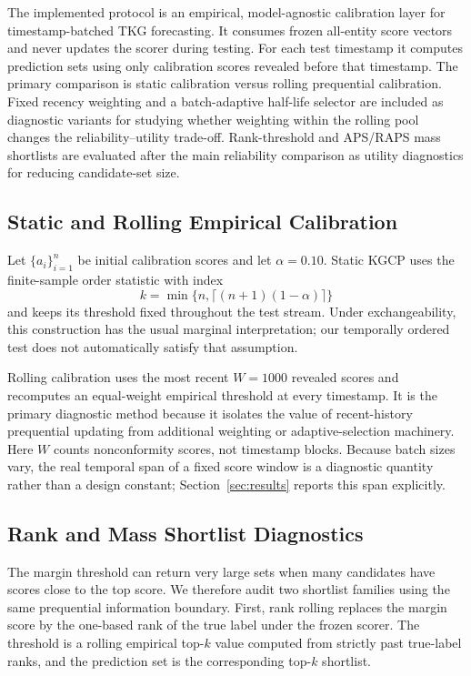 \documentclass[10pt,twocolumn]{article}
\begin{document}
The implemented protocol is an empirical, model-agnostic calibration layer for
timestamp-batched TKG forecasting. It consumes frozen all-entity score vectors
and never updates the scorer during testing. For each test timestamp it computes
prediction sets using only calibration scores revealed before that timestamp.
The primary comparison is static calibration versus rolling prequential
calibration. Fixed recency weighting and a batch-adaptive half-life selector are
included as diagnostic variants for studying whether weighting within the
rolling pool changes the reliability--utility trade-off. Rank-threshold and
APS/RAPS mass shortlists are evaluated after the main reliability comparison as
utility diagnostics for reducing candidate-set size.

\subsection{Static and Rolling Empirical Calibration}

Let \(\{a_i\}_{i=1}^{n}\) be initial calibration scores and let
\(\alpha=0.10\). Static KGCP uses the finite-sample order statistic with index
\[
  k=\min\{n,\lceil(n+1)(1-\alpha)\rceil\}
\]
and keeps its threshold fixed throughout the test stream. Under exchangeability,
this construction has the usual marginal interpretation; our temporally ordered
test does not automatically satisfy that assumption.

Rolling calibration uses the most recent \(W=1000\) revealed scores and
recomputes an equal-weight empirical threshold at every timestamp. It is the
primary diagnostic method because it isolates the value of recent-history
prequential updating from additional weighting or adaptive-selection machinery.
Here \(W\) counts nonconformity scores, not timestamp blocks. Because batch
sizes vary, the real temporal span of a fixed score window is a diagnostic
quantity rather than a design constant; Section~\ref{sec:results} reports this
span explicitly.

\subsection{Rank and Mass Shortlist Diagnostics}

The margin threshold can return very large sets when many candidates have scores
close to the top score. We therefore audit two shortlist families using the
same prequential information boundary. First, rank rolling replaces the margin
score by the one-based rank of the true label under the frozen scorer. The
threshold is a rolling empirical top-\(k\) value computed from strictly past
true-label ranks, and the prediction set is the corresponding top-\(k\)
shortlist.
\end{document}
